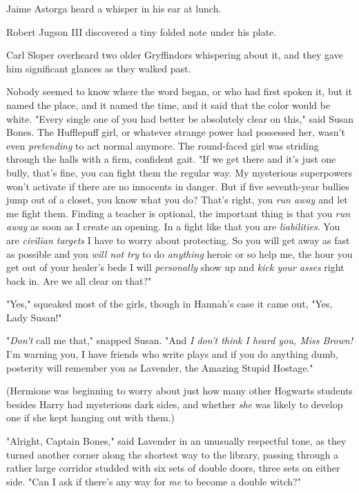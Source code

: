 Jaime Astorga heard a whisper in his ear at lunch.

Robert Jugson III discovered a tiny folded note under his plate.

Carl Sloper overheard two older Gryffindors whispering about it, and they gave
him significant glances as they walked past.

Nobody seemed to know where the word began, or who had first spoken it, but it
named the place, and it named the time, and it said that the color would be
white.
\sbreak
"Every single one of you had better be absolutely clear on this," said Susan
Bones. The Hufflepuff girl, or whatever strange power had possessed her, wasn't
even \emph{pretending} to act normal anymore. The round-faced girl was striding
through the halls with a firm, confident gait. "If we get there and it's just
one bully, that's fine, you can fight them the regular way. My mysterious
superpowers won't activate if there are no innocents in danger. But if five
seventh-year bullies jump out of a closet, you know what you do? That's right,
you \emph{run away} and let me fight them. Finding a teacher is optional, the
important thing is that you \emph{run away} as soon as I create an opening. In
a fight like that you are \emph{liabilities}. You are \emph{civilian targets} I
have to worry about protecting. So you will get away as fast as possible and
you \emph{will not try} to do \emph{anything} heroic or so help me, the hour
you get out of your healer's beds I will \emph{personally} show up and
\emph{kick your asses} right back in. Are we all clear on that?"

"Yes," squeaked most of the girls, though in Hannah's case it came out, "Yes,
Lady Susan!"

"\emph{Don't} call me that," snapped Susan. "And \emph{I don't think I heard
you, Miss Brown!} I'm warning you, I have friends who write plays and if you do
anything dumb, posterity will remember you as Lavender, the Amazing Stupid
Hostage."

(Hermione was beginning to worry about just how many other Hogwarts students
besides Harry had mysterious dark sides, and whether \emph{she} was likely to
develop one if she kept hanging out with them.)

"Alright, Captain Bones," said Lavender in an unusually respectful tone, as
they turned another corner along the shortest way to the library, passing
through a rather large corridor studded with six sets of double doors, three
sets on either side. "Can I ask if there's any way for \emph{me} to become a
double witch?"


